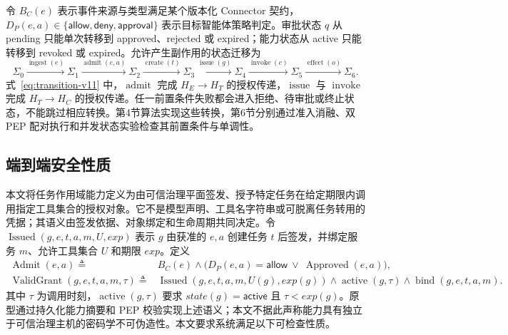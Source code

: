 令 $B_C(e)$ 表示事件来源与类型满足某个版本化 Connector 契约，$D_P(e,a)\in\{\mathsf{allow},\mathsf{deny},\mathsf{approval}\}$ 表示目标智能体策略判定。审批状态 $q$ 从 pending 只能单次转移到 approved、rejected 或 expired；能力状态从 active 只能转移到 revoked 或 expired。允许产生副作用的状态迁移为
\begin{equation}
\Sigma_0 \xrightarrow{\operatorname{ingest}(e)}
\Sigma_1 \xrightarrow{\operatorname{admit}(e,a)}
\Sigma_2 \xrightarrow{\operatorname{create}(t)}
\Sigma_3 \xrightarrow{\operatorname{issue}(g)}
\Sigma_4 \xrightarrow{\operatorname{invoke}(c)}
\Sigma_5 \xrightarrow{\operatorname{effect}(o)} \Sigma_6 .
\label{eq:transition-v11}
\end{equation}
式~\eqref{eq:transition-v11} 中，$\operatorname{admit}$ 完成 $H_E\rightarrow H_T$ 的授权传递，$\operatorname{issue}$ 与 $\operatorname{invoke}$ 完成 $H_T\rightarrow H_C$ 的授权传递。任一前置条件失败都会进入拒绝、待审批或终止状态，不能跳过相应转换。第4节算法实现这些转换，第6节分别通过准入消融、双 PEP 配对执行和并发状态实验检查其前置条件与单调性。

\subsection{端到端安全性质}

本文将任务作用域能力定义为由可信治理平面签发、授予特定任务在给定期限内调用指定工具集合的授权对象。它不是模型声明、工具名字符串或可脱离任务转用的凭据；其语义由签发依据、对象绑定和生命周期共同决定。令 $\operatorname{Issued}(g,e,t,a,m,U,exp)$ 表示 $g$ 由获准的 $e,a$ 创建任务 $t$ 后签发，并绑定服务 $m$、允许工具集合 $U$ 和期限 $exp$。定义
\begin{align}
\operatorname{Admit}(e,a) \triangleq {}& B_C(e)\land
\bigl(D_P(e,a)=\mathsf{allow}\ \lor\ \operatorname{Approved}(e,a)\bigr), \\
\operatorname{ValidGrant}(g,e,t,a,m,\tau) \triangleq {}&
\operatorname{Issued}(g,e,t,a,m,U(g),exp(g))\land
\operatorname{active}(g,\tau)\land
\operatorname{bind}(g,e,t,a,m).
\label{eq:predicates-v11}
\end{align}
其中 $\tau$ 为调用时刻，$\operatorname{active}(g,\tau)$ 要求 $state(g)=\mathsf{active}$ 且 $\tau<exp(g)$。原型通过持久化能力摘要和 PEP 校验实现上述语义；本文不据此声称能力具有独立于可信治理主机的密码学不可伪造性。本文要求系统满足以下可检查性质。

